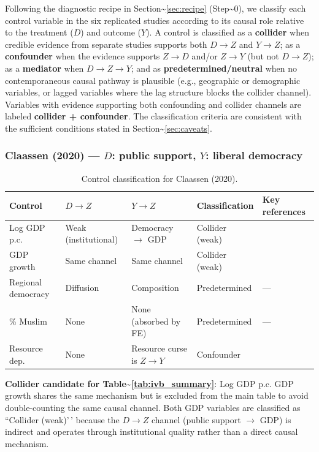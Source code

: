 \documentclass[
]{article}
\begin{document}
Following the diagnostic recipe in
Section\textasciitilde{}\ref{sec:recipe} (Step\textasciitilde0), we
classify each control variable in the six replicated studies according
to its causal role relative to the treatment (\(D\)) and outcome
(\(Y\)). A control is classified as a \textbf{collider} when credible
evidence from separate studies supports both \(D \to Z\) and
\(Y \to Z\); as a \textbf{confounder} when the evidence supports
\(Z \to D\) and/or \(Z \to Y\) (but not \(D \to Z\)); as a
\textbf{mediator} when \(D \to Z \to Y\); and as
\textbf{predetermined/neutral} when no contemporaneous causal pathway is
plausible (e.g., geographic or demographic variables, or lagged
variables where the lag structure blocks the collider channel).
Variables with evidence supporting both confounding and collider
channels are labeled \textbf{collider + confounder}. The classification
criteria are consistent with the sufficient conditions stated in
Section\textasciitilde{}\ref{sec:caveats}.

\subsubsection{\texorpdfstring{Claassen (2020) --- \(D\): public
support, \(Y\): liberal
democracy}{Claassen (2020) --- D: public support, Y: liberal democracy}}\label{claassen-2020-d-public-support-y-liberal-democracy}

\begin{table}[H]
\centering
\small
\caption{Control classification for Claassen (2020).}
\begin{tabular}{llllp{3cm}}
\toprule
Control & $D \to Z$ & $Y \to Z$ & Classification & Key references \\
\midrule
Log GDP p.c. & Weak (institutional) & Democracy $\to$ GDP & Collider (weak) & \citet{acemoglu_etal2019} \\
GDP growth & Same channel & Same channel & Collider (weak) & \citet{acemoglu_etal2019} \\
Regional democracy & Diffusion & Composition & Predetermined & --- \\
\% Muslim & None & None (absorbed by FE) & Predetermined & --- \\
Resource dep. & None & Resource curse is $Z \to Y$ & Confounder & \citet{ross2001} \\
\bottomrule
\end{tabular}
\end{table}

\textbf{Collider candidate for
Table\textasciitilde{}\ref{tab:ivb_summary}}: Log GDP p.c. GDP growth
shares the same mechanism but is excluded from the main table to avoid
double-counting the same causal channel. Both GDP variables are
classified as ``Collider (weak)'\,' because the \(D \to Z\) channel
(public support \(\to\) GDP) is indirect and operates through
institutional quality rather than a direct causal mechanism.
\end{document}
